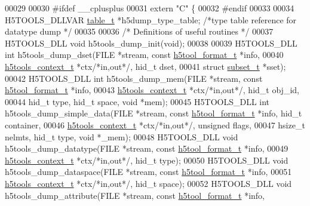 \begin{DoxyCode}
00029 
00030 \textcolor{preprocessor}{#ifdef \_\_cplusplus}
00031 \textcolor{keyword}{extern} \textcolor{stringliteral}{"C"} \{
00032 \textcolor{preprocessor}{#endif}
00033 
00034 H5TOOLS\_DLLVAR \hyperlink{structtable__t}{table\_t} *h5dump\_type\_table;  \textcolor{comment}{/*type table reference for datatype dump  */}
00035 
00036 \textcolor{comment}{/* Definitions of useful routines */}
00037 H5TOOLS\_DLL \textcolor{keywordtype}{void}    h5tools\_dump\_init(\textcolor{keywordtype}{void});
00038 
00039 H5TOOLS\_DLL \textcolor{keywordtype}{int}     h5tools\_dump\_dset(FILE *stream, \textcolor{keyword}{const} \hyperlink{structh5tool__format__t}{h5tool\_format\_t} *info,
00040                             \hyperlink{structh5tools__context__t}{h5tools\_context\_t} *ctx\textcolor{comment}{/*in,out*/}, hid\_t dset,
00041                             \textcolor{keyword}{struct} \hyperlink{structsubset__t}{subset\_t} *sset);
00042 H5TOOLS\_DLL \textcolor{keywordtype}{int}     h5tools\_dump\_mem(FILE *stream, \textcolor{keyword}{const} \hyperlink{structh5tool__format__t}{h5tool\_format\_t} *info,
00043                             \hyperlink{structh5tools__context__t}{h5tools\_context\_t} *ctx\textcolor{comment}{/*in,out*/}, hid\_t obj\_id,
00044                             hid\_t type, hid\_t space, \textcolor{keywordtype}{void} *mem);
00045 H5TOOLS\_DLL \textcolor{keywordtype}{int}     h5tools\_dump\_simple\_data(FILE *stream, \textcolor{keyword}{const} \hyperlink{structh5tool__format__t}{h5tool\_format\_t} *info, 
      hid\_t container,
00046                             \hyperlink{structh5tools__context__t}{h5tools\_context\_t} *ctx\textcolor{comment}{/*in,out*/}, \textcolor{keywordtype}{unsigned} flags,
00047                             hsize\_t nelmts, hid\_t type, \textcolor{keywordtype}{void} *\_mem);
00048 H5TOOLS\_DLL \textcolor{keywordtype}{void}    h5tools\_dump\_datatype(FILE *stream, \textcolor{keyword}{const} \hyperlink{structh5tool__format__t}{h5tool\_format\_t} *info,
00049                             \hyperlink{structh5tools__context__t}{h5tools\_context\_t} *ctx\textcolor{comment}{/*in,out*/}, hid\_t type);
00050 H5TOOLS\_DLL \textcolor{keywordtype}{void}    h5tools\_dump\_dataspace(FILE *stream, \textcolor{keyword}{const} \hyperlink{structh5tool__format__t}{h5tool\_format\_t} *info,
00051                             \hyperlink{structh5tools__context__t}{h5tools\_context\_t} *ctx\textcolor{comment}{/*in,out*/}, hid\_t space);
00052 H5TOOLS\_DLL \textcolor{keywordtype}{void}    h5tools\_dump\_attribute(FILE *stream, \textcolor{keyword}{const} \hyperlink{structh5tool__format__t}{h5tool\_format\_t} *info,

\end{DoxyCode}
